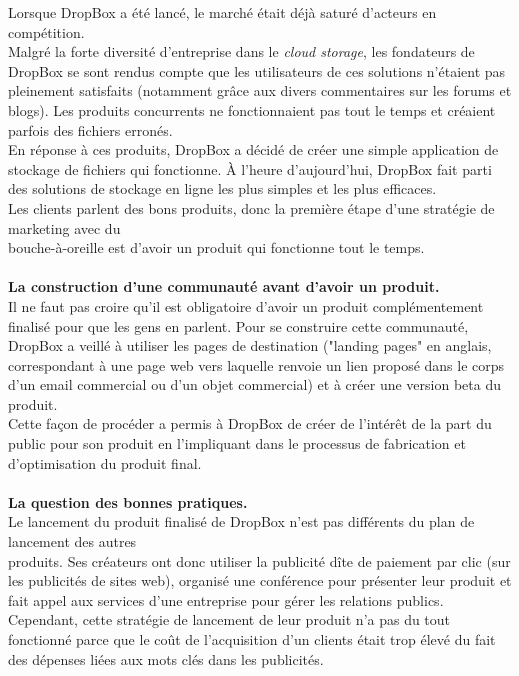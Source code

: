 \documentclass[a4paper, 10pt]{article}
\begin{document}
Lorsque DropBox a été lancé, le marché était déjà saturé d'acteurs en compétition.\\
Malgré la forte diversité d'entreprise dans le \textit{cloud storage}, les fondateurs de DropBox se sont rendus compte que 
les utilisateurs de ces solutions n'étaient pas pleinement satisfaits (notamment grâce aux divers commentaires sur les forums et blogs).
Les produits concurrents ne fonctionnaient pas tout le temps et créaient parfois des fichiers erronés.\\
En réponse à ces produits, DropBox a décidé de créer une simple application de stockage de fichiers qui fonctionne.
À l'heure d'aujourd'hui, DropBox fait parti des solutions de stockage en ligne les plus simples et les plus efficaces.\\
Les clients parlent des bons produits, donc la première étape d'une stratégie de marketing avec du\\bouche-à-oreille est d'avoir
un produit qui fonctionne tout le temps.\\ \\
\textbf{La construction d'une communauté avant d'avoir un produit.}\\
Il ne faut pas croire qu'il est obligatoire d'avoir un produit complémentement finalisé pour que les gens en parlent.
Pour se construire cette communauté, DropBox a veillé à utiliser les pages de destination ("landing pages" en anglais,
correspondant à une page web vers laquelle renvoie un lien proposé dans le corps d'un email commercial ou d'un objet commercial)
et à créer une version beta du produit.\\
Cette façon de procéder a permis à DropBox de créer de l'intérêt de la part du public pour son produit en l'impliquant dans le processus
de fabrication et d'optimisation du produit final.\\ \\
\textbf{La question des bonnes pratiques.}\\
Le lancement du produit finalisé de DropBox n'est pas différents du plan de lancement des autres\\produits.
Ses créateurs ont donc utiliser la publicité dîte de paiement par clic (sur les publicités de sites web),
organisé une conférence pour présenter leur produit et fait appel aux services d'une entreprise pour gérer les relations publics.\\
Cependant, cette stratégie de lancement de leur produit n'a pas du tout fonctionné parce que le coût de l'acquisition d'un clients
était trop élevé du fait des dépenses liées aux mots clés dans les publicités.\\
\end{document}
